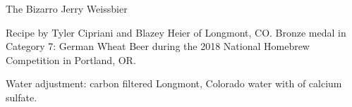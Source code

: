 \begin{recipe}{The Bizarro Jerry Weissbier} %

\begin{aboutblock}
Recipe by Tyler Cipriani and Blazey Heier of Longmont, CO. Bronze medal in 
Category 7: German Wheat Beer during the 2018 National Homebrew Competition
in Portland, OR. \sourceaha
\end{aboutblock}


\begin{methodandtiming}
 
\begin{mashsteps}
\end{mashsteps}

\begin{fermentationsteps}
\end{fermentationsteps}

\begin{directions}
Water adjustment: carbon filtered Longmont, Colorado water with  of
calcium sulfate.
\end{directions}

\end{methodandtiming}

\recipebreak

\begin{ingredientsblock}

\begin{malts}
\end{malts}

\begin{hops}
\end{hops}


\end{ingredientsblock}

\end{recipe}

